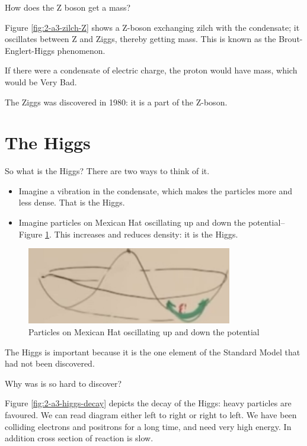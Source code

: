 \documentclass[]{article}
\begin{document}
How does the Z boson get a mass?

Figure \ref{fig:2-a3-zilch-Z} shows a Z-boson exchanging zilch with the condensate; it oscillates between Z and Ziggs, thereby getting mass. This is known as the Brout-Englert-Higgs phenomenon.

If there were a condensate of electric charge, the proton would have mass, which would be Very Bad.

The Ziggs was discovered in 1980: it is a part of the Z-boson.

\section{The Higgs}

So what is the Higgs? There are two ways to think of it.
\begin{itemize}
	\item Imagine a vibration in the condensate, which makes the particles more and less dense. That is the Higgs.
	\item Imagine particles on Mexican Hat oscillating up and down the potential--Figure \ref{fig:2-a3-higgs1}. This increases and reduces density: it is the Higgs.
\end{itemize}

\begin{figure}[H]
	\caption{Particles on Mexican Hat oscillating up and down the potential}\label{fig:2-a3-higgs1}
	\includegraphics[width=0.8\textwidth]{2-a3-higgs1}
\end{figure}

The Higgs is important because it is the one element of the Standard Model that had not been discovered.

Why was is so hard to discover?

Figure \ref{fig:2-a3-higgs-decay} depicts the decay of the Higgs: heavy particles are favoured. We can read diagram either left to right or right to left. We have been colliding electrons and positrons for a long time, and need very high energy. In addition cross section of reaction is slow.
\end{document}
